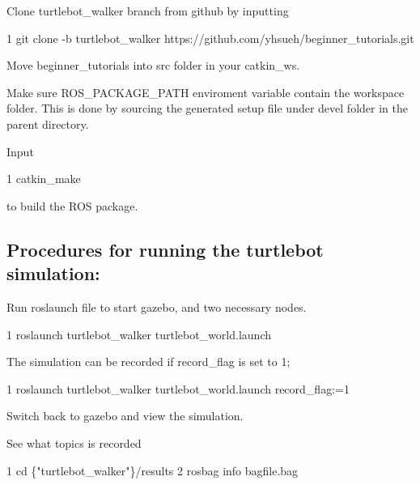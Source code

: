 
\begin{DoxyEnumerate}
\item Clone turtlebot\+\_\+walker branch from github by inputting 
\begin{DoxyCode}
1 git clone -b turtlebot\_walker https://github.com/yhsueh/beginner\_tutorials.git
\end{DoxyCode}

\item Move beginner\+\_\+tutorials into src folder in your catkin\+\_\+ws.
\end{DoxyEnumerate}
\begin{DoxyEnumerate}
\item Make sure R\+O\+S\+\_\+\+P\+A\+C\+K\+A\+G\+E\+\_\+\+P\+A\+TH enviroment variable contain the workspace folder. This is done by sourcing the generated setup file under devel folder in the parent directory.
\item Input 
\begin{DoxyCode}
1 catkin\_make
\end{DoxyCode}
 to build the R\+OS package.
\end{DoxyEnumerate}

\subsection*{Procedures for running the turtlebot simulation\+:}


\begin{DoxyEnumerate}
\item Run roslaunch file to start gazebo, and two necessary nodes. 
\begin{DoxyCode}
1 roslaunch turtlebot\_walker turtlebot\_world.launch
\end{DoxyCode}
 The simulation can be recorded if record\+\_\+flag is set to 1; 
\begin{DoxyCode}
1 roslaunch turtlebot\_walker turtlebot\_world.launch record\_flag:=1
\end{DoxyCode}

\item Switch back to gazebo and view the simulation.
\item See what topics is recorded 
\begin{DoxyCode}
1 cd \{"turtlebot\_walker"\}/results
2 rosbag info bagfile.bag
\end{DoxyCode}
 
\end{DoxyEnumerate}